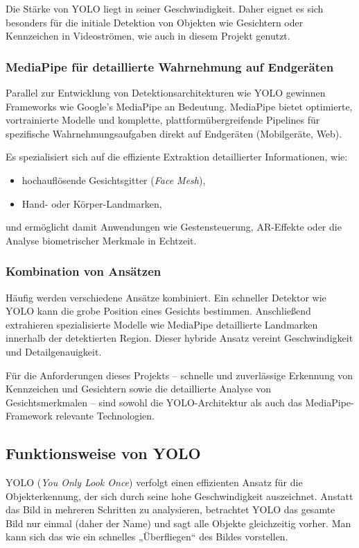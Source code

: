 Die Stärke von YOLO liegt in seiner Geschwindigkeit. Daher eignet es sich besonders für die initiale Detektion von Objekten wie Gesichtern oder Kennzeichen in Videoströmen, wie auch in diesem Projekt genutzt.

\subsubsection{MediaPipe für detaillierte Wahrnehmung auf Endgeräten}

Parallel zur Entwicklung von Detektionsarchitekturen wie YOLO gewinnen Frameworks wie Google's MediaPipe an Bedeutung. MediaPipe bietet optimierte, vortrainierte Modelle und komplette, plattformübergreifende Pipelines für spezifische Wahrnehmungsaufgaben direkt auf Endgeräten (Mobilgeräte, Web). 

Es spezialisiert sich auf die effiziente Extraktion detaillierter Informationen, wie:
\begin{itemize}
    \item hochauflösende Gesichtsgitter (\textit{Face Mesh}),
    \item Hand- oder Körper-Landmarken,
\end{itemize}
und ermöglicht damit Anwendungen wie Gestensteuerung, AR-Effekte oder die Analyse biometrischer Merkmale in Echtzeit.

\subsubsection{Kombination von Ansätzen}

Häufig werden verschiedene Ansätze kombiniert. Ein schneller Detektor wie YOLO kann die grobe Position eines Gesichts bestimmen. Anschließend extrahieren spezialisierte Modelle wie MediaPipe detaillierte Landmarken innerhalb der detektierten Region. Dieser hybride Ansatz vereint Geschwindigkeit und Detailgenauigkeit.

Für die Anforderungen dieses Projekts – schnelle und zuverlässige Erkennung von Kennzeichen und Gesichtern sowie die detaillierte Analyse von Gesichtsmerkmalen – sind sowohl die YOLO-Architektur als auch das MediaPipe-Framework relevante Technologien.

\subsection{Funktionsweise von YOLO}

YOLO (\textit{You Only Look Once}) verfolgt einen effizienten Ansatz für die Objekterkennung, der sich durch seine hohe Geschwindigkeit auszeichnet. Anstatt das Bild in mehreren Schritten zu analysieren, betrachtet YOLO das gesamte Bild nur einmal (daher der Name) und sagt alle Objekte gleichzeitig vorher. Man kann sich das wie ein schnelles „Überfliegen“ des Bildes vorstellen.

